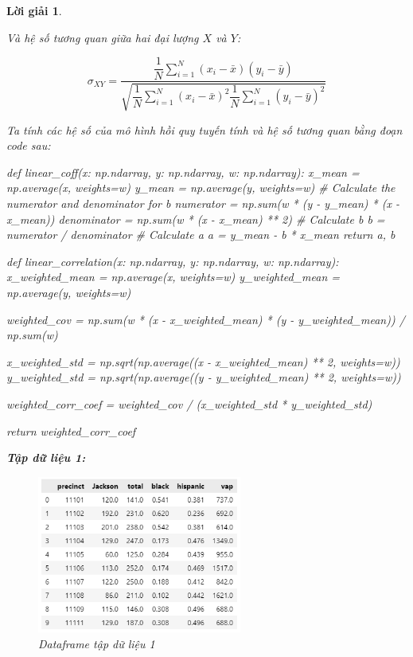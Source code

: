 \documentclass[14pt, a4paper]{article}
\theoremstyle{sltheorem}
\theoremstyle{soltheorem}
\newtheorem*{loigiai}{Lời giải}
\begin{document}
\begin{loigiai}
\begin{enumerate}
        Và hệ số tương quan giữa hai đại lượng $X$ và $Y$:

        \begin{equation*}
            \sigma_{XY} = \dfrac{\dfrac{1}{N} \sum_{i=1}^N (x_i - \bar{x})(y_i - \bar{y})}{\sqrt{\dfrac{1}{N} \sum_{i=1}^N (x_i - \bar{x})^2 \dfrac{1}{N} \sum_{i=1}^N (y_i - \bar{y})^2}}
        \end{equation*}

        Ta tính các hệ số của mô hình hồi quy tuyến tính và hệ số tương quan bằng đoạn code sau:

        \begin{python}
def linear_coff(x: np.ndarray, y: np.ndarray, w: np.ndarray):
    x_mean = np.average(x, weights=w)
    y_mean = np.average(y, weights=w)
    # Calculate the numerator and denominator for b
    numerator = np.sum(w * (y - y_mean) * (x - x_mean))
    denominator = np.sum(w * (x - x_mean) ** 2)
    # Calculate b
    b = numerator / denominator
    # Calculate a
    a = y_mean - b * x_mean
    return a, b
        \end{python}


\begin{python}
def linear_correlation(x: np.ndarray, y: np.ndarray, w: np.ndarray):
    x_weighted_mean = np.average(x, weights=w)
    y_weighted_mean = np.average(y, weights=w)
    
    weighted_cov = np.sum(w * (x - x_weighted_mean) * (y - y_weighted_mean)) / np.sum(w)
    
    x_weighted_std = np.sqrt(np.average((x - x_weighted_mean) ** 2, weights=w))
    y_weighted_std = np.sqrt(np.average((y - y_weighted_mean) ** 2, weights=w))
    
    weighted_corr_coef = weighted_cov / (x_weighted_std * y_weighted_std)
    
    return weighted_corr_coef
\end{python}

    \textbf{Tập dữ liệu 1:}

    \begin{figure}[H]
        \centering
        \includegraphics[width=0.6\textwidth]{figures/primary_df.png}
        \caption{Dataframe tập dữ liệu 1}
        \label{fig:primary_df}
    \end{figure}


\end{enumerate}
\end{loigiai}
\end{document}
